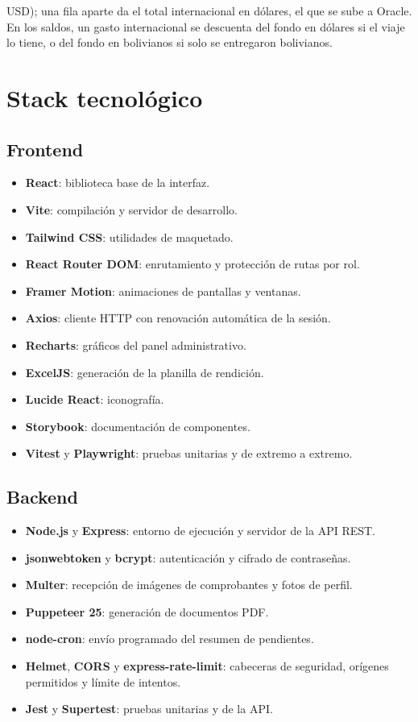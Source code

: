 \documentclass[11pt,letterpaper]{article}
\begin{document}
USD); una fila aparte da el total internacional en dólares, el que se sube a Oracle. En los saldos, un gasto internacional se descuenta del fondo en dólares si el viaje lo tiene, o del fondo en bolivianos si solo se entregaron bolivianos.

\section{Stack tecnológico}

\subsection{Frontend}
\begin{itemize}
  \item \textbf{React}: biblioteca base de la interfaz.
  \item \textbf{Vite}: compilación y servidor de desarrollo.
  \item \textbf{Tailwind CSS}: utilidades de maquetado.
  \item \textbf{React Router DOM}: enrutamiento y protección de rutas por rol.
  \item \textbf{Framer Motion}: animaciones de pantallas y ventanas.
  \item \textbf{Axios}: cliente HTTP con renovación automática de la sesión.
  \item \textbf{Recharts}: gráficos del panel administrativo.
  \item \textbf{ExcelJS}: generación de la planilla de rendición.
  \item \textbf{Lucide React}: iconografía.
  \item \textbf{Storybook}: documentación de componentes.
  \item \textbf{Vitest} y \textbf{Playwright}: pruebas unitarias y de extremo a extremo.
\end{itemize}

\subsection{Backend}
\begin{itemize}
  \item \textbf{Node.js} y \textbf{Express}: entorno de ejecución y servidor de la API REST.
  \item \textbf{jsonwebtoken} y \textbf{bcrypt}: autenticación y cifrado de contraseñas.
  \item \textbf{Multer}: recepción de imágenes de comprobantes y fotos de perfil.
  \item \textbf{Puppeteer 25}: generación de documentos PDF.
  \item \textbf{node-cron}: envío programado del resumen de pendientes.
  \item \textbf{Helmet}, \textbf{CORS} y \textbf{express-rate-limit}: cabeceras de seguridad, orígenes permitidos y límite de intentos.
  \item \textbf{Jest} y \textbf{Supertest}: pruebas unitarias y de la API.
\end{itemize}
\end{document}
